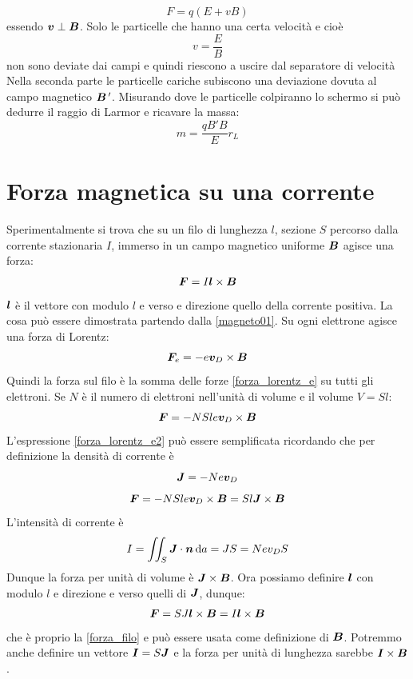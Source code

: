 \begin{Es}
\begin{equation*}F=q(E+vB)\end{equation*}
essendo $\boldsymbol{v}\perp\boldsymbol{B}$. Solo le particelle che hanno una certa velocità e cioè 
\begin{equation*}v=\frac{E}{B}\end{equation*}
non sono deviate dai campi e quindi riescono a uscire dal separatore di velocità  Nella seconda parte le particelle cariche subiscono una deviazione dovuta al campo magnetico $\boldsymbol{B}\,'$. Misurando dove le particelle colpiranno lo schermo si può dedurre il raggio di Larmor e ricavare la massa:
\begin{equation*}m=\frac{qB'B}{E}r_L\end{equation*}
\end{Es}

\section{Forza magnetica su una corrente}
Sperimentalmente si trova che su un filo di lunghezza $l$, sezione $S$ percorso dalla corrente stazionaria $I$, immerso in un campo magnetico uniforme $\boldsymbol{B}$ agisce una forza:
\begin{equation}
\boldsymbol{F}=I\boldsymbol{l}\times \boldsymbol{B}
\label{forza_filo}
\end{equation}
$\boldsymbol{l}$ è il vettore con modulo $l$ e verso e direzione quello della corrente positiva. La cosa può essere dimostrata partendo dalla \eqref{magneto01}. Su ogni elettrone agisce una forza di Lorentz:
\begin{equation}
\boldsymbol{F}_e=-e\boldsymbol{v}_D\times\boldsymbol{B}
\label{forza_lorentz_e}
\end{equation}
Quindi la forza sul filo è la somma delle forze \eqref{forza_lorentz_e} su tutti gli elettroni. Se $N$ è il numero di elettroni nell'unità di volume e il volume $V=Sl$:
\begin{equation}
\boldsymbol{F}=-NSle\boldsymbol{v}_D\times\boldsymbol{B}
\label{forza_lorentz_e2}
\end{equation}
L'espressione \eqref{forza_lorentz_e2} può essere semplificata ricordando che per definizione la densità di corrente è 
\begin{equation*}
\boldsymbol{J}=-Ne\boldsymbol{v}_D
\end{equation*}
\begin{equation}
\boldsymbol{F}=-NSle\boldsymbol{v}_D\times\boldsymbol{B}=Sl\boldsymbol{J}\times\boldsymbol{B}
\end{equation}
L'intensità di corrente è 
\begin{equation*}I=\iint_S \boldsymbol{J}\cdot \boldsymbol{n}\,\mathrm{d} a=JS=Nev_DS\end{equation*}
Dunque la forza per unità di volume è $\boldsymbol{J}\times\boldsymbol{B}$. Ora possiamo definire $\boldsymbol{l}$ con modulo $l$ e direzione e verso quelli di $\boldsymbol{J}$, dunque:
\begin{equation}
\boldsymbol{F}=SJ\boldsymbol{l}\times\boldsymbol{B}=I\boldsymbol{l}\times \boldsymbol{B}
\label{forza_lorentz_3}
\end{equation}
che è proprio la \eqref{forza_filo} e può essere usata come definizione di $\boldsymbol{B}$. Potremmo anche definire un vettore $\boldsymbol{I}=S\boldsymbol{J}$ e la forza per unità di lunghezza sarebbe $\boldsymbol{I}\times\boldsymbol{B}$.
